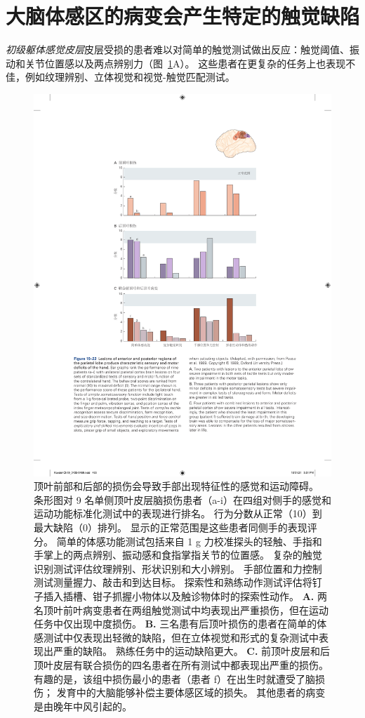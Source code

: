\section{大脑体感区的病变会产生特定的触觉缺陷}

\textit{初级躯体感觉皮层}皮层受损的患者难以对简单的触觉测试做出反应：触觉阈值、振动和关节位置感以及两点辨别力（图~\ref{fig:19_22}A）。
这些患者在更复杂的任务上也表现不佳，例如纹理辨别、立体视觉和视觉-触觉匹配测试。


\begin{figure}[htbp]
	\centering
	\includegraphics[width=0.8\linewidth]{chap19/fig_19_22}
	\caption{顶叶前部和后部的损伤会导致手部出现特征性的感觉和运动障碍。
		条形图对 9 名单侧顶叶皮层脑损伤患者（a-i）在四组对侧手的感觉和运动功能标准化测试中的表现进行排名。
		行为分数从正常（10）到最大缺陷（0）排列。
		显示的正常范围是这些患者同侧手的表现评分。
		简单的体感功能测试包括来自 1 g 力校准探头的轻触、手指和手掌上的两点辨别、振动感和食指掌指关节的位置感。
		复杂的触觉识别测试评估纹理辨别、形状识别和大小辨别。
		手部位置和力控制测试测量握力、敲击和到达目标。
		探索性和熟练动作测试评估将钉子插入插槽、钳子抓握小物体以及触诊物体时的探索性动作\cite{pause1989sensorimotor}。
		\textbf{A.} 两名顶叶前叶病变患者在两组触觉测试中均表现出严重损伤，但在运动任务中仅出现中度损伤。
		\textbf{B.} 三名患有后顶叶损伤的患者在简单的体感测试中仅表现出轻微的缺陷，但在立体视觉和形式的复杂测试中表现出严重的缺陷。
		熟练任务中的运动缺陷更大。
		\textbf{C.} 前顶叶皮层和后顶叶皮层有联合损伤的四名患者在所有测试中都表现出严重的损伤。
		有趣的是，该组中损伤最小的患者（患者 f）在出生时就遭受了脑损伤；
		发育中的大脑能够补偿主要体感区域的损失。
		其他患者的病变是由晚年中风引起的。}
	\label{fig:19_22}
\end{figure}


